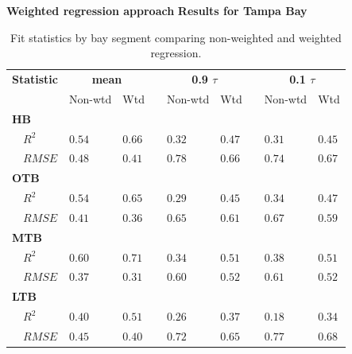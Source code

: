 \documentclass[serif]{beamer}\usepackage[]{graphicx}\usepackage[]{color}
\begin{document}
\begin{frame}{\textbf{Weighted regression approach}}{\textbf{ Results for Tampa Bay}}
\vspace{-0.07in}
\begin{table}[!tbp]
{\footnotesize
\caption{Fit statistics by bay segment comparing non-weighted and weighted regression.\label{tab:modperf}} 
\begin{center}
\begin{tabular}{lllcllcll}
\hline\hline
\multicolumn{1}{l}{\bfseries Statistic}&\multicolumn{2}{c}{\bfseries mean}&\multicolumn{1}{c}{\bfseries }&\multicolumn{2}{c}{\bfseries 0.9 $\tau$}&\multicolumn{1}{c}{\bfseries }&\multicolumn{2}{c}{\bfseries 0.1 $\tau$}\tabularnewline
\cline{2-3} \cline{5-6} \cline{8-9}
\multicolumn{1}{l}{}&\multicolumn{1}{c}{Non-wtd}&\multicolumn{1}{c}{Wtd}&\multicolumn{1}{c}{}&\multicolumn{1}{c}{Non-wtd}&\multicolumn{1}{c}{Wtd}&\multicolumn{1}{c}{}&\multicolumn{1}{c}{Non-wtd}&\multicolumn{1}{c}{Wtd}\tabularnewline
\hline
{\bfseries HB}&&&&&&&&\tabularnewline
~~$R^2$&$0.54$&$0.66$&&$0.32$&$0.47$&&$0.31$&$0.45$\tabularnewline
~~$RMSE$&$0.48$&$0.41$&&$0.78$&$0.66$&&$0.74$&$0.67$\tabularnewline
\hline
{\bfseries OTB}&&&&&&&&\tabularnewline
~~$R^2$&$0.54$&$0.65$&&$0.29$&$0.45$&&$0.34$&$0.47$\tabularnewline
~~$RMSE$&$0.41$&$0.36$&&$0.65$&$0.61$&&$0.67$&$0.59$\tabularnewline
\hline
{\bfseries MTB}&&&&&&&&\tabularnewline
~~$R^2$&$0.60$&$0.71$&&$0.34$&$0.51$&&$0.38$&$0.51$\tabularnewline
~~$RMSE$&$0.37$&$0.31$&&$0.60$&$0.52$&&$0.61$&$0.52$\tabularnewline
\hline
{\bfseries LTB}&&&&&&&&\tabularnewline
~~$R^2$&$0.40$&$0.51$&&$0.26$&$0.37$&&$0.18$&$0.34$\tabularnewline
~~$RMSE$&$0.45$&$0.40$&&$0.72$&$0.65$&&$0.77$&$0.68$\tabularnewline
\hline
\end{tabular}\end{center}}

\end{table}

\end{frame}
\end{document}
